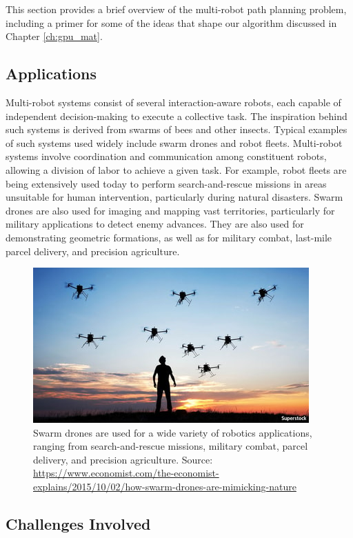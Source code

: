 This section provides a brief overview of the multi-robot path planning problem, including a primer for some of the ideas that shape our algorithm discussed in Chapter \ref{ch:gpu_mat}. 

\subsection{Applications}

Multi-robot systems consist of several interaction-aware robots, each capable of independent decision-making to execute a collective task. The inspiration behind such systems is derived from swarms of bees and other insects. Typical examples of such systems used widely include swarm drones and robot fleets. Multi-robot systems involve coordination and communication among constituent robots, allowing a division of labor to achieve a given task. For example, robot fleets are being extensively used today to perform search-and-rescue missions in areas unsuitable for human intervention, particularly during natural disasters. Swarm drones are also used for imaging and mapping vast territories, particularly for military applications to detect enemy advances. They are also used for demonstrating geometric formations, as well as for military combat, last-mile parcel delivery, and precision agriculture. 

\begin{figure}[ht]
    \centering
    \includegraphics[scale=0.5]{figures/background/swarm_drones.jpg}
    \caption[Swarm Drones]{Swarm drones are used for a wide variety of robotics applications, ranging from search-and-rescue missions, military combat, parcel delivery, and precision agriculture. Source: \scriptsize{\url{https://www.economist.com/the-economist-explains/2015/10/02/how-swarm-drones-are-mimicking-nature}}}
    \label{fig:swarm-drones}
\end{figure}

\subsection{Challenges Involved}

